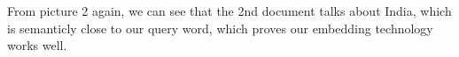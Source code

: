 \documentclass[UTF8]{article}
\begin{document}
	\begin{figure}[H]
		\centering
		\centering
	\end{figure}
	From picture 2 again, we can see that the 2nd document talks about India, which is semanticly close to our query word, which proves our embedding technology works well.
	
\end{document}
